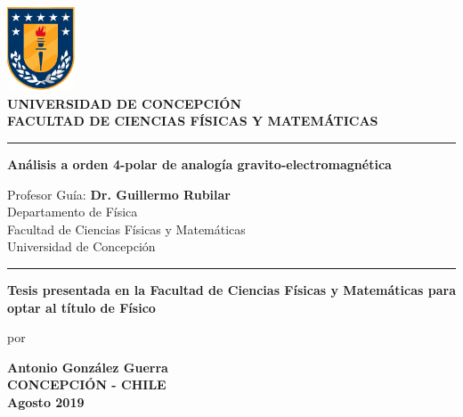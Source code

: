 \thispagestyle{empty}
\pagestyle{empty}
\begin{center}
	\includegraphics[width=2cm]{logo_udec}\\
	\vspace{0.3cm}
	\textbf{UNIVERSIDAD DE CONCEPCI\'ON} \\ 
	\textbf{FACULTAD DE CIENCIAS F\'ISICAS Y MATEM\'ATICAS} \\
	\vspace{0.6cm}	
	\rule{14.5cm}{0.1cm}
	\vspace{0.5cm}

	
	{\Large \textbf{Análisis a orden 4-polar de analogía gravito-electromagnética}}
	
	\vspace{1.0cm}
	
	{ Profesor Gu\'ia: \textbf{Dr. Guillermo Rubilar}\\ 
		Departamento de F\'isica \\ 
		Facultad de Ciencias F\'isicas y Matem\'aticas \\
		Universidad de Concepci\'on}
	
	\vspace{0.7cm}
	\rule{14.5cm}{0.1cm}
	\vspace{0.35cm}	
	
	
\textbf{Tesis presentada en la Facultad de Ciencias F\'isicas y Matem\'aticas para optar al t\'itulo de F\'isico}

	\vfill
	por
	
	\textbf{Antonio Gonz\'alez Guerra \\ 
	CONCEPCI\'ON -  CHILE \\
	Agosto 2019}
\end{center}

\thispagestyle{empty}